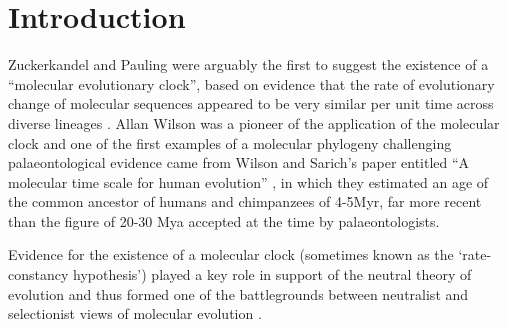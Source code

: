 \section{Introduction} 
Zuckerkandel and Pauling were arguably the first to suggest the existence of a ``molecular evolutionary clock'', based on evidence that the rate of evolutionary change of molecular sequences appeared to be very similar per unit time across diverse lineages \cite{zuckerkandl1965}. Allan Wilson was a pioneer of the application of the molecular clock and one of the first examples of a molecular phylogeny challenging palaeontological evidence came from Wilson and Sarich's paper entitled ``A molecular time scale for human evolution'' \cite{WilsonSarich1969}, in which they estimated an age of the common ancestor of humans and chimpanzees of 4-5Myr, far more recent than the figure of 20-30 Mya accepted at the time by palaeontologists.

Evidence for the existence of a molecular clock (sometimes known as the `rate-constancy hypothesis') played a key role in support of the neutral theory of evolution and thus formed one of the battlegrounds between neutralist and selectionist views of molecular evolution \cite{Kimura1987}.
  
  
  
  
  
  
  
  
  
  
  
  